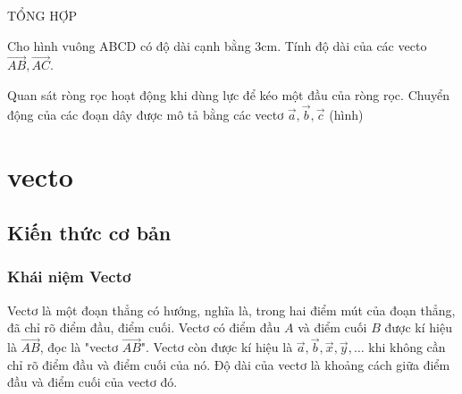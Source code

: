 \begin{dang}{TỔNG HỢP}
    \begin{vd}
        Cho hình vuông ABCD có độ dài cạnh bằng 3cm. Tính độ dài của các vecto $\vec{AB}, \vec{AC}$.
    \end{vd}

    \begin{vd}
        Quan sát ròng rọc hoạt động khi dùng lực để kéo một đầu của ròng rọc. Chuyển động của các đoạn dây được mô tả bằng các vectơ $\vec{a},\vec{b},\vec{c}$ (hình)
    \end{vd}
\end{dang}


\chapter{vecto}

\section{Kiến thức cơ bản}

\subsection{Khái niệm Vectơ}
\begin{dn}
    Vectơ là một đoạn thẳng có hướng, nghĩa là, trong hai điểm mút của đoạn thẳng, đã chỉ rõ điểm đầu, điểm cuối.
    Vectơ có điểm đầu $A$ và điểm cuối $B$ được kí hiệu là $\vec{AB}$, đọc là "vectơ $\vec{AB}$".
    Vectơ còn được kí hiệu là $\vec{a}, \vec{b}, \vec{x}, \vec{y}, \dots$ khi không cần chỉ rõ điểm đầu và điểm cuối của nó.
    Độ dài của vectơ là khoảng cách giữa điểm đầu và điểm cuối của vectơ đó.
\end{dn}


